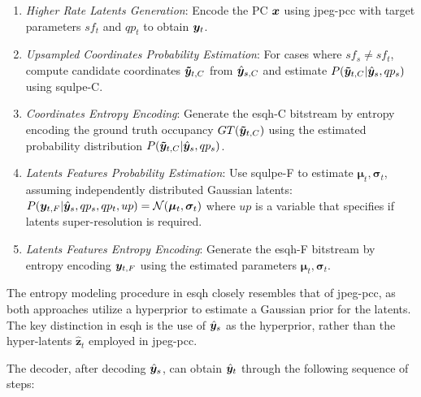 \begin{enumerate}[label=E\arabic*.]
    \item \textit{Higher Rate Latents Generation}: Encode the PC $\x$ using \gls{jpeg-pcc} with target parameters $sf_t$ and $qp_t$ to obtain $\y_{t}$.
    \item \textit{Upsampled Coordinates Probability Estimation}: For cases where $sf_s \neq sf_t$, compute candidate coordinates $\boldsymbol{\Tilde{y}}_{t, C}$ from $\hat{\y}_{s, C}$ and estimate $P(\boldsymbol{\Tilde{y}}_{t, C}|\hat{\y}_{s}, qp_s)$ using \gls{squlpe}-C.
    \item \textit{Coordinates Entropy Encoding}: Generate the \gls{esqh}-C bitstream by entropy encoding the ground truth occupancy $GT(\boldsymbol{\Tilde{\y}}_{t, C})$ using the estimated probability distribution $P(\boldsymbol{\Tilde{y}}_{t, C}|\hat{\y}_{s}, qp_s)$.
    \item \textit{Latents Features Probability Estimation}: Use \gls{squlpe}-F to estimate $\boldsymbol{\mu}_{t}, \boldsymbol{\sigma}_{t}$, assuming independently distributed Gaussian latents: $P(\y_{t, F}|\hat{\y}_{s}, qp_s, qp_t, up) = \mathcal{N}(\boldsymbol{\mu}_{t}, \boldsymbol{\sigma}_{t})$ where $up$ is a variable that specifies if latents super-resolution is required.
    \item \textit{Latents Features Entropy Encoding}: Generate the \gls{esqh}-F bitstream by entropy encoding $\y_{t, F}$ using the estimated parameters $\boldsymbol{\mu}_{t}, \boldsymbol{\sigma}_{t}$.
\end{enumerate}

The entropy modeling procedure in \gls{esqh} closely resembles that of \gls{jpeg-pcc}, as both approaches utilize a hyperprior to estimate a Gaussian prior for the latents. The key distinction in \gls{esqh} is the use of $\hat{\y}_{s}$ as the hyperprior, rather than the hyper-latents $\hat{\boldsymbol{z}}_{t}$ employed in \gls{jpeg-pcc}.

The decoder, after decoding $\hat{\y}_{s}$, can obtain $\hat{\y}_{t}$ through the following sequence of steps:


